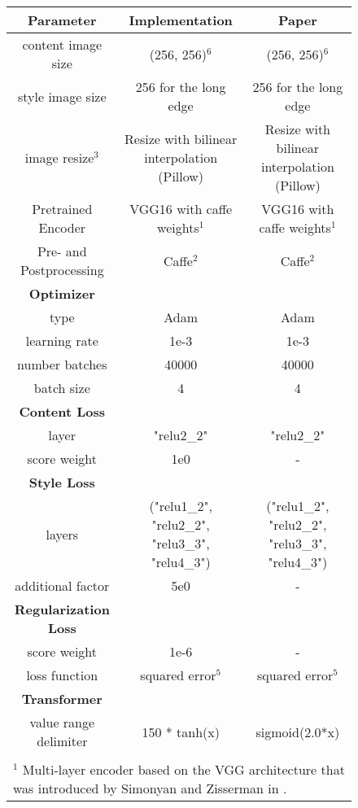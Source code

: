 \begin{figure}[H]
	\vspace{17cm}
	\begin{center}
		\begin{rotate}{90}
			\footnotesize
		\centering
		\begin{tabular}{c|c|c}
			\hline
			\bfseries Parameter & \bfseries Implementation & \bfseries Paper\\
			\hline\hline
			content image size & (256, 256)$^6$ & (256, 256)$^6$ \\
			style image size & 256 for the long edge & 256 for the long edge\\
			image resize$^3$ & Resize with bilinear interpolation (Pillow) & Resize with bilinear interpolation (Pillow)\\
			Pretrained Encoder & VGG16 with caffe weights$^1$ & VGG16 with caffe weights$^1$ \\
			Pre- and Postprocessing & Caffe$^2$ & Caffe$^2$\\
			\hline
			\bfseries Optimizer & &\\
			\hline
			type & Adam & Adam \\
			learning rate & 1e-3 & 1e-3 \\
			number batches & 40000 & 40000\\
			batch size & 4 & 4 \\
			\hline
			\bfseries  Content Loss & & \\
			\hline
			layer & "relu2\_2" & "relu2\_2" \\
			score weight & 1e0 & - \\
			\hline
			\bfseries  Style Loss & & \\
			\hline
			layers & ("relu1\_2", "relu2\_2", "relu3\_3", "relu4\_3")& ("relu1\_2", "relu2\_2", "relu3\_3", "relu4\_3")\\
			additional factor & 5e0 & - \\
			\hline
			\bfseries  Regularization Loss & & \\
			\hline
			score weight & 1e-6 & - \\
			loss function & squared error$^5$ & squared error$^5$ \\
			\hline
			\hline
			\bfseries  Transformer & & \\
			\hline
			value range delimiter & 150 * tanh(x) & sigmoid(2.0*x)\\
			\hline
\multicolumn{3}{l}{ }\\
\multicolumn{3}{l}{\scriptsize{$^1$ Multi-layer encoder based on the VGG architecture that was introduced by Simonyan and Zisserman in \cite{SZ2015}.}}\\

\end{tabular}
\end{rotate}
\end{center}
\end{figure}
